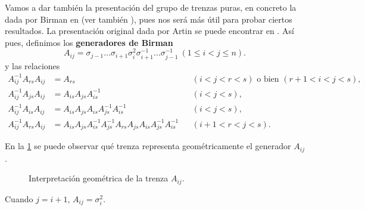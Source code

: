 \documentclass[bibtex, anon]{TEMat-article}
\begin{document}
Vamos a dar también la presentación del grupo de trenzas puras, en concreto la dada por Birman en \cite{Birman} (ver también \cite{polynomial}), pues nos será más útil para probar ciertos resultados. La presentación original dada por Artin se puede encontrar en \cite{Artin}. Así pues, definimos los \textbf{generadores de Birman}
\begin{equation}\label{birman}
A_{ij}=\sigma_{j-1}\dots\sigma_{i+1}\sigma_i^2\sigma_{i+1}^{-1}\dots\sigma_{j-1}^{-1}\ (1\leq i<j\leq n).
\end{equation}
y las relaciones %
\begin{align*}
A_{ij}^{-1}A_{rs}A_{ij}&=A_{rs} & & (i<j<r<s)\text{ o bien } (r+1<i<j<s),\\
A_{ij}^{-1}A_{js}A_{ij}&=A_{is}A_{js}A_{is}^{-1} & &(i<j<s),\\
A_{ij}^{-1}A_{is}A_{ij}&=A_{is}A_{js}A_{is}A_{js}^{-1}A_{is}^{-1} & &(i<j<s),\\
A_{ij}^{-1}A_{rs}A_{ij}&=A_{is}A_{js}A_{is}^{-1}A_{js}^{-1}A_{rs}A_{js}A_{is}A_{js}^{-1}A_{is}^{-1} & &(i+1<r<j<s).
\end{align*}

En la \cref{generador} se puede observar qué trenza representa geométricamente el generador $A_{ij}$. 

\begin{figure}[h!]
	\centering
	\caption{Interpretación geométrica de la trenza $A_{ij}$.}\label{generador}
\end{figure}


\begin{nota}
	Cuando $j=i+1$, $A_{ij}=\sigma_i^2$. 
\end{nota}
\end{document}
